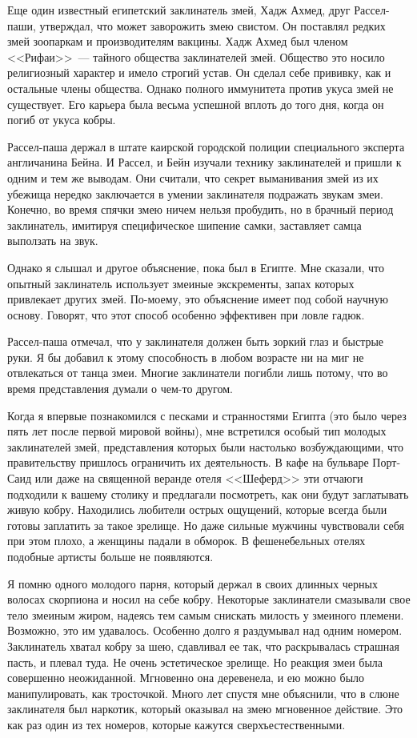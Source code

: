 \documentclass[12pt,a4paper,twoside,openany,svgnames]{memoir}
\begin{document}
Еще один известный египетский заклинатель змей, Хадж Ахмед, друг Рассел-паши, утверждал, что может заворожить змею свистом. Он поставлял редких змей зоопаркам и производителям вакцины. Хадж Ахмед был членом <<Рифаи>>~--- тайного общества заклинателей змей. Общество это носило религиозный характер и имело строгий устав. Он сделал себе прививку, как и остальные члены общества. Однако полного иммунитета против укуса змей не существует. Его карьера была весьма успешной вплоть до того дня, когда он погиб от укуса кобры.

Рассел-паша держал в штате каирской городской полиции специального эксперта англичанина Бейна. И Рассел, и Бейн изучали технику заклинателей и пришли к одним и тем же выводам. Они считали, что секрет выманивания змей из их убежища нередко заключается в умении заклинателя подражать звукам змеи. Конечно, во время спячки змею ничем нельзя пробудить, но в брачный период заклинатель, имитируя специфическое шипение самки, заставляет самца выползать на звук.

Однако я слышал и другое объяснение, пока был в Египте. Мне сказали, что опытный заклинатель использует змеиные экскременты, запах которых привлекает других змей. По-моему, это объяснение имеет под собой научную основу. Говорят, что этот способ особенно эффективен при ловле гадюк.

Рассел-паша отмечал, что у заклинателя должен быть зоркий глаз и быстрые руки. Я бы добавил к этому способность в любом возрасте ни на миг не отвлекаться от танца змеи. Многие заклинатели погибли лишь потому, что во время представления думали о чем-то другом.

Когда я впервые познакомился с песками и странностями Египта (это было через пять лет после первой мировой войны), мне встретился особый тип молодых заклинателей змей, представления которых были настолько возбуждающими, что правительству пришлось ограничить их деятельность. В кафе на бульваре Порт-Саид или даже на священной веранде отеля <<Шеферд>> эти отчаюги подходили к вашему столику и предлагали посмотреть, как они будут заглатывать живую кобру. Находились любители острых ощущений, которые всегда были готовы заплатить за такое зрелище. Но даже сильные мужчины чувствовали себя при этом плохо, а женщины падали в обморок. В фешенебельных отелях подобные артисты больше не появляются.

Я помню одного молодого парня, который держал в своих длинных черных волосах скорпиона и носил на себе кобру. Некоторые заклинатели смазывали свое тело змеиным жиром, надеясь тем самым снискать милость у змеиного племени. Возможно, это им удавалось. Особенно долго я раздумывал над одним номером. Заклинатель хватал кобру за шею, сдавливал ее так, что раскрывалась страшная пасть, и плевал туда. Не очень эстетическое зрелище. Но реакция змеи была совершенно неожиданной. Мгновенно она деревенела, и ею можно было манипулировать, как тросточкой. Много лет спустя мне объяснили, что в слюне заклинателя был наркотик, который оказывал на змею мгновенное действие. Это как раз один из тех номеров, которые кажутся сверхъестественными.
\end{document}
